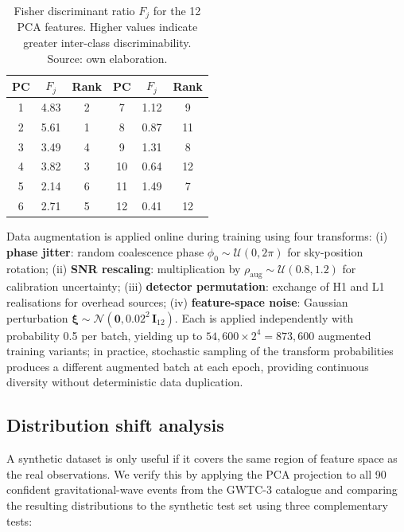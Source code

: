 \documentclass[11pt,a4paper, english]{book}
\theoremstyle{plain}
\theoremstyle{definition}
\numberwithin{equation}{chapter}
\numberwithin{figure}{chapter}
\numberwithin{table}{chapter}
\begin{document}
\begin{table}[ht]
\centering
\begin{tabular}{@{}ccc|ccc@{}}
\toprule
\textbf{PC} & $F_j$ & \textbf{Rank} &
\textbf{PC} & $F_j$ & \textbf{Rank} \\
\midrule
1  & 4.83 & 2  &  7 & 1.12 & 9  \\
2  & 5.61 & 1  &  8 & 0.87 & 11 \\
3  & 3.49 & 4  &  9 & 1.31 & 8  \\
4  & 3.82 & 3  & 10 & 0.64 & 12 \\
5  & 2.14 & 6  & 11 & 1.49 & 7  \\
6  & 2.71 & 5  & 12 & 0.41 & 12 \\
\bottomrule
\end{tabular}
\caption[Fisher discriminant ratios for PCA features]{Fisher discriminant ratio $F_j$ for the 12 PCA features.
         Higher values indicate greater inter-class discriminability. Source: own elaboration.}
\label{tab:feature_stats}
\vspace{2pt}
\normalsize

\end{table}

Data augmentation is applied online during training using four transforms: (i) \textbf{phase jitter}: random coalescence phase $\phi_0 \sim \mathcal{U}(0, 2\pi)$ for sky-position rotation; (ii) \textbf{SNR rescaling}: multiplication by $\rho_\mathrm{aug} \sim \mathcal{U}(0.8, 1.2)$ for calibration uncertainty; (iii) \textbf{detector permutation}: exchange of H1 and L1 realisations for overhead sources; (iv) \textbf{feature-space noise}: Gaussian perturbation $\boldsymbol{\xi} \sim \mathcal{N}(\mathbf{0}, 0.02^2\,\mathbf{I}_{12})$. Each is applied independently with probability 0.5 per batch, yielding up to $54{,}600 \times 2^4 = 873{,}600$ 
augmented training variants; in practice, stochastic 
sampling of the transform probabilities produces a 
different augmented batch at each epoch, providing 
continuous diversity without deterministic 
data duplication.

\subsection{Distribution shift analysis}
\label{subsec:distribution_shift}

A synthetic dataset is only useful if it covers the same region of feature space as the real observations. We verify this by applying the PCA projection to all 90 confident gravitational-wave events from the GWTC-3 catalogue and comparing the resulting distributions to the synthetic test set using three complementary tests:
\end{document}
